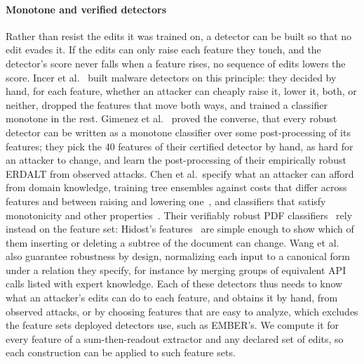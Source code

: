 \paragraph{Monotone and verified detectors}
Rather than resist the edits it was trained on, a detector can be built so that no edit evades it. If the edits can
only raise each feature they touch, and the detector's score never falls when a feature rises, no sequence of edits
lowers the score. Incer et al.~\cite{incer2018adversarially} built malware detectors on this principle: they decided by
hand, for each feature, whether an attacker can cheaply raise it, lower it, both, or neither, dropped the features that
move both ways, and trained a classifier monotone in the rest. Gimenez et al.~\cite{gimenez2025certifiably} proved the
converse, that every robust detector can be written as a monotone classifier over some post-processing of its features; they pick the
40 features of their certified detector by hand, as hard for an attacker to change, and learn the post-processing of
their empirically robust ERDALT from observed attacks. Chen et al.\ specify what an attacker can afford from domain
knowledge, training tree ensembles against costs that differ across features and between raising and lowering
one~\cite{chen2021cost}, and classifiers that satisfy monotonicity and other properties~\cite{chen2021learning}.
Their verifiably robust PDF classifiers~\cite{chen2020training} rely instead on the feature set: Hidost's
features~\cite{srndic2016hidost} are simple enough to show which of them inserting or deleting a subtree of the document
can change. Wang et al.~\cite{wang2022robust} also guarantee robustness by design, normalizing each input to a canonical
form under a relation they specify, for instance by merging groups of equivalent API calls listed with expert
knowledge. Each of these detectors thus needs to know what an attacker's edits can do to each feature, and obtains it
by hand, from observed attacks, or by choosing features that are easy to analyze, which excludes the feature sets
deployed detectors use, such as EMBER's. We compute it for every feature of a sum-then-readout extractor and any
declared set of edits, so each construction can be applied to such feature sets.

